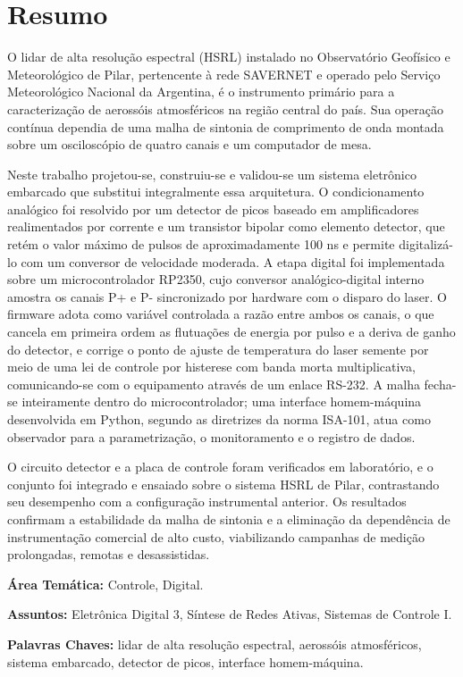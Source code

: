 \chapter*{Resumo}
{}

O lidar de alta resolução espectral (HSRL) instalado no Observatório Geofísico e Meteorológico de Pilar, pertencente à rede SAVERNET e operado pelo Serviço Meteorológico Nacional da Argentina, é o instrumento primário para a caracterização de aerossóis atmosféricos na região central do país. Sua operação contínua dependia de uma malha de sintonia de comprimento de onda montada sobre um osciloscópio de quatro canais e um computador de mesa.

Neste trabalho projetou-se, construiu-se e validou-se um sistema eletrônico embarcado que substitui integralmente essa arquitetura. O condicionamento analógico foi resolvido por um detector de picos baseado em amplificadores realimentados por corrente e um transistor bipolar como elemento detector, que retém o valor máximo de pulsos de aproximadamente 100 ns e permite digitalizá-lo com um conversor de velocidade moderada. A etapa digital foi implementada sobre um microcontrolador RP2350, cujo conversor analógico-digital interno amostra os canais P+ e P- sincronizado por hardware com o disparo do laser. O firmware adota como variável controlada a razão entre ambos os canais, o que cancela em primeira ordem as flutuações de energia por pulso e a deriva de ganho do detector, e corrige o ponto de ajuste de temperatura do laser semente por meio de uma lei de controle por histerese com banda morta multiplicativa, comunicando-se com o equipamento através de um enlace RS-232. A malha fecha-se inteiramente dentro do microcontrolador; uma interface homem-máquina desenvolvida em Python, segundo as diretrizes da norma ISA-101, atua como observador para a parametrização, o monitoramento e o registro de dados.

O circuito detector e a placa de controle foram verificados em laboratório, e o conjunto foi integrado e ensaiado sobre o sistema HSRL de Pilar, contrastando seu desempenho com a configuração instrumental anterior. Os resultados confirmam a estabilidade da malha de sintonia e a eliminação da dependência de instrumentação comercial de alto custo, viabilizando campanhas de medição prolongadas, remotas e desassistidas.

\vspace{1cm}
\noindent\textbf{\'Area Tem\'atica:} Controle, Digital.

\noindent\textbf{Assuntos:} Eletr\^onica Digital 3, S\'intese de Redes
Ativas, Sistemas de Controle I.

\noindent\textbf{Palavras Chaves:} lidar de alta resolução espectral, aerossóis atmosféricos, sistema embarcado, detector de picos, interface homem-máquina.

\cleardoublepage
